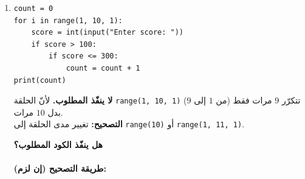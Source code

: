 \documentclass[14pt]{extarticle}
\begin{document}
\begin{enumerate}[label=\textbf{السؤال \arabic*:}, wide=0pt, itemsep=2.2em]
\begin{enumerate}[label=\textbf{مقطع \alph*:}, wide=0pt, itemsep=1.5em]
\item \mbox{}
\begin{boxCode}
\begin{english}
\begin{verbatim}
count = 0
for i in range(1, 10, 1):
    score = int(input("Enter score: "))
    if score > 100:
        if score <= 300:
            count = count + 1
print(count)
\end{verbatim}
\end{english}
\end{boxCode}
\ifwithsols
\begin{boxSolution}
\textbf{لا ينفّذ المطلوب.} لأنّ الحلقة \textenglish{\texttt{range(1, 10, 1)}} تتكرّر $9$ مرات فقط (من $1$ إلى $9$) بدل $10$ مرات. \\
\textbf{التصحيح:} تغيير مدى الحلقة إلى \textenglish{\texttt{range(10)}} أو \textenglish{\texttt{range(1, 11, 1)}}.
\end{boxSolution}
\else
\vspace{0.5cm}
\textbf{هل ينفّذ الكود المطلوب؟} \hrulefill \\
 \\
\textbf{طريقة التصحيح (إن لزم):} \hrulefill
\fi
\filbreak

\end{enumerate}

\clearpage





\end{enumerate}
\end{document}
